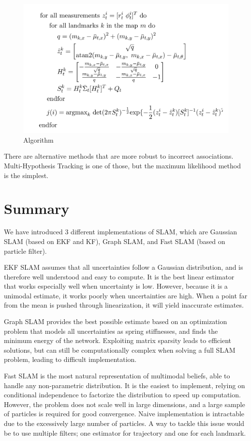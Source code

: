 \documentclass[twoside]{article}
\begin{document}
\begin{figure}[H]
\centering
\includegraphics[]{algorithm_fig1}
\caption{Algorithm}
\end{figure}

There are alternative methods that are more robust to incorrect associations. Multi-Hypothesis Tracking is one of those, but the maximum likelihood method is the simplest.

\section {Summary}

We have introduced 3 different implementations of SLAM, which are Gaussian SLAM (based on EKF and KF), Graph SLAM, and Fast SLAM (based on particle filter). 

EKF SLAM assumes that all uncertainties follow a Gaussian distribution, and is therefore well understood and easy to compute. It is the best linear estimator that works especially well when uncertainty is low. However, because it is a unimodal estimate, it works poorly when uncertainties are high. When a point far from the mean is pushed through linearization, it will yield inaccurate estimates.

Graph SLAM provides the best possible estimate based on an optimization problem that models all uncertainties as spring stiffnesses, and finds the minimum energy of the network. Exploiting matrix sparsity leads to efficient solutions, but can still be computationally complex when solving a full SLAM problem, leading to difficult implementation.

Fast SLAM is the most natural representation of multimodal beliefs, able to handle any non-parametric distribution. It is the easiest to implement, relying on conditional independence to factorize the distribution to speed up computation. However, the problem does not scale well in large dimensions, and a large sample of particles is required for good convergence. Naive implementation is intractable due to the excessively large number of particles. A way to tackle this issue would be to use multiple filters; one estimator for trajectory and one for each landmark.
\end{document}
